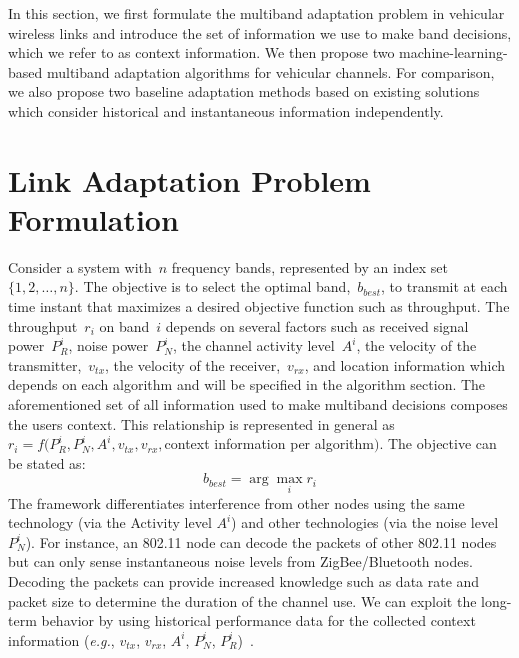 

In this section, we first formulate the multiband 
adaptation problem in vehicular wireless links and introduce the set of information we use to make band decisions, which we refer to as context information. We then propose two machine-learning-based 
multiband adaptation algorithms for vehicular channels. For comparison, we also propose two baseline adaptation methods based on existing solutions which consider historical and instantaneous information independently.




\section{Link Adaptation Problem Formulation}

Consider a system with~$n$ frequency bands, represented by an index set~$\{1,2, \ldots, n\}$. 
The objective is to select the optimal band,~$b_{best}$, to transmit at each time instant that maximizes a desired objective function such as throughput. The throughput~$r_i$ on band~$i$ depends on several factors such as received signal power~$P_R^i$, noise power~$P_N^i$, the channel activity level~$A^i$, the velocity of the transmitter,~$v_{tx}$,
 the velocity of the receiver,~$v_{rx}$, 
 and location information which depends on each algorithm and will be specified in the algorithm section. The aforementioned set of all information used to make multiband decisions composes the users context. 
This relationship is represented in general as~$r_i = f(P_R^i, P_N^i, A^i, v_{tx}, v_{rx}, $context information per algorithm$)$. The objective can be stated as:
\begin{equation}
b_{best}= \arg \max_i r_i 
\end{equation}
The framework differentiates interference from other nodes using the same technology (via the Activity level $A^i$) and other technologies (via the noise level~$P_N^i$). For instance, an 802.11 node can decode the packets of other 802.11 nodes but can only sense
instantaneous noise levels from ZigBee/Bluetooth nodes. 
Decoding the packets can provide increased knowledge such as 
data rate and packet size to determine the duration of the channel use.
We can exploit the long-term behavior by using historical performance
data for the collected context information
({\it e.g.}, $v_{tx}$, $v_{rx}$, $A^i$, $P_N^i$, $P_R^i$)~\cite{meikle2012global}. 


